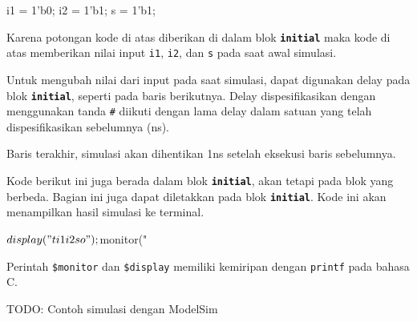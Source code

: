 \begin{verilogcode}
i1 = 1'b0;
i2 = 1'b1;
s  = 1'b1;
\end{verilogcode}

Karena potongan kode di atas diberikan di dalam blok {\tt\textbf{initial}}
maka kode di atas memberikan nilai input {\tt i1}, {\tt i2}, dan {\tt s}
pada saat awal simulasi.

Untuk mengubah nilai dari input pada saat simulasi, dapat digunakan delay
pada blok {\tt\textbf{initial}}, seperti pada baris berikutnya. Delay
dispesifikasikan dengan menggunakan tanda {\tt \#} diikuti dengan lama delay
dalam satuan yang telah dispesifikasikan sebelumnya (ns).


Baris terakhir, simulasi akan dihentikan 1ns setelah eksekusi baris sebelumnya.

Kode berikut ini juga berada dalam blok {\tt\textbf{initial}}, akan
tetapi pada blok yang berbeda. Bagian ini
juga dapat diletakkan pada blok {\tt\textbf{initial}}.
Kode ini akan menampilkan hasil simulasi ke terminal.
\begin{verilogcode}
$display("  t   i1   i2   s    o");
$monitor("%
\end{verilogcode}

Perintah \verb|$monitor| dan \verb|$display| memiliki kemiripan
dengan \verb|printf| pada bahasa C.

{\color{red} TODO: Contoh simulasi dengan ModelSim}


